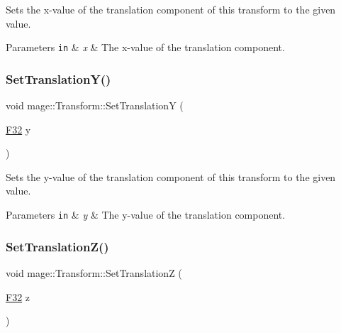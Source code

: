 Sets the x-\/value of the translation component of this transform to the given value.


\begin{DoxyParams}[1]{Parameters}
\mbox{\tt in}  & {\em x} & The x-\/value of the translation component. \\
\hline
\end{DoxyParams}
\hypertarget{structmage_1_1_transform_ae33a9ea844cac0bdb303e4e347e576c3}{}\label{structmage_1_1_transform_ae33a9ea844cac0bdb303e4e347e576c3} 
\subsubsection{\texorpdfstring{Set\+Translation\+Y()}{SetTranslationY()}}
{\footnotesize\ttfamily void mage\+::\+Transform\+::\+Set\+TranslationY (\begin{DoxyParamCaption}\item[{\hyperlink{namespacemage_aa97e833b45f06d60a0a9c4fc22ae02c0}{F32}}]{y }\end{DoxyParamCaption})\hspace{0.3cm}{\ttfamily [noexcept]}}

Sets the y-\/value of the translation component of this transform to the given value.


\begin{DoxyParams}[1]{Parameters}
\mbox{\tt in}  & {\em y} & The y-\/value of the translation component. \\
\hline
\end{DoxyParams}
\hypertarget{structmage_1_1_transform_a71009b20361c01c0ffbd981986d323e8}{}\label{structmage_1_1_transform_a71009b20361c01c0ffbd981986d323e8} 
\subsubsection{\texorpdfstring{Set\+Translation\+Z()}{SetTranslationZ()}}
{\footnotesize\ttfamily void mage\+::\+Transform\+::\+Set\+TranslationZ (\begin{DoxyParamCaption}\item[{\hyperlink{namespacemage_aa97e833b45f06d60a0a9c4fc22ae02c0}{F32}}]{z }\end{DoxyParamCaption})\hspace{0.3cm}{\ttfamily [noexcept]}}

